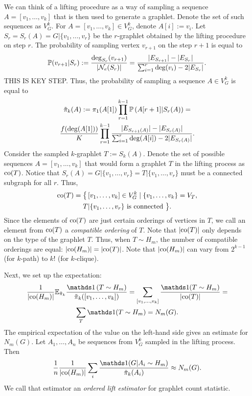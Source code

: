	We can think of a lifting procedure as a way of sampling a sequence $A = [v_1, \ldots, v_k]$ that is then used to generate a graphlet.
	Denote the set of such sequences as $V^k_G$.
	For $A = [v_1, \ldots, v_k] \in V^k_G$, denote $A[i]:=v_i$.
	Let $S_r = S_r(A) = G|\{v_1,\ldots, v_r\}$ be the $r$-graphlet obtained by the lifting procedure on step $r$.
	The probability of sampling vertex $v_{r+1}$ on the step $r+1$ is equal to
	\begin{equation*}
	    \mathbb{P}(v_{r+1}|S_{r}) := \frac{\mathrm{deg}_{S_r}(v_{r+1})}{|\mathcal{N}_e(S_r)|} =
	    \frac{|E_{S_{r+1}}| - |E_{S_r}|}{\sum_{i=1}^r \mathrm{deg}(v_i) - 2|E_{S_r}|}.
	\end{equation*}
	THIS IS KEY STEP.
	Thus, the probability of sampling a sequence $A \in V^k_G$ is equal to
	\begin{multline}
	\label{eq:tildepi}
	    \Tilde\pi_k(A) := \pi_1(A[1])\prod_{r=1}^{k-1} \P\left(A[r+1]|S_r(A)\right) =\\
	    \frac{f(\deg(A[1]))}{K} \prod_{r=1}^{k-1} \frac{|E_{S_{r+1}(A)}| - |E_{S_r(A)}|}{\sum_{i=1}^r \deg(A[i]) - 2|E_{S_r(A)}|}.
	\end{multline}
	Consider the sampled $k$-graphlet $T := S_k(A)$.
	Denote the set of possible sequences $A = [v_1,\ldots, v_k]$ that would form a graphlet $T$ in the lifting process as $\mathrm{co}(T)$.
	Notice that $S_r(A) = G|\{v_1,\ldots,v_r\} = T|\{v_1,\ldots,v_r\}$ must be a connected subgraph for all $r$.
	Thus,
	\begin{multline}
	\label{eq:co}
	    \co(T) = \big\{\,[v_1,\ldots,v_k]\in V^k_G \mid \{v_1,\ldots,v_k\} = V_T,\\  T|\{v_1,\ldots,v_r\} \text{ is connected }\big\}.
	\end{multline}
	Since the elements of $\mathrm{co}(T)$ are just certain orderings of vertices in $T$, we call an element from $\mathrm{co}(T)$ a \textit{compatible ordering} of $T$.
	Note that $|\mathrm{co}(T)|$ only depends on the type of the graphlet $T$.
	Thus, when $T\sim H_m$, the number of compatible orderings are equal: $|\mathrm{co}(H_m)| = |\mathrm{co}(T)|$. Note that $|\mathrm{co}(H_m)|$ can vary from $2^{k-1}$ (for $k$-path) to $k!$ (for $k$-clique).
	
	Next, we set up the expectation:
	\begin{multline*}
	    \frac{1}{|\co(H_m)|}\E_{\tilde \pi_k} \frac{\ind\left(T \sim H_m\right)}{\tilde\pi_k([v_1, \ldots, v_k])} = 
	    \sum_{[v_1, \ldots, v_k]} \frac{\ind(T \sim H_m)}{|\co(T)|} = \\
	    \sum_T \ind(T \sim H_m) = N_m(G).
	\end{multline*}
	The empirical expectation of the value on the left-hand side gives an estimate for $N_m(G)$.
	Let $A_1,\ldots,A_n$ be sequences from $V^k_G$ sampled in the lifting process.
	Then
	\begin{equation*}
	    \frac{1}{n}\frac{1}{|\co(H_m)|}\sum_{i} \frac{\ind(G|A_i \sim H_m)}{\tilde\pi_k(A_i)} \approx N_m(G).
	\end{equation*}
	We call that estimator an \textit{ordered lift estimator} for graphlet count statistic.
	
